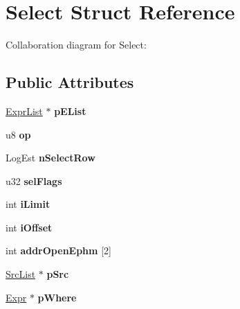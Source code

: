 \hypertarget{structSelect}{}\section{Select Struct Reference}
\label{structSelect}


Collaboration diagram for Select\+:
\subsection*{Public Attributes}
\begin{DoxyCompactItemize}
\item 
\hyperlink{structExprList}{Expr\+List} $\ast$ {\bfseries p\+E\+List}\hypertarget{structSelect_acf92c5d6b0e0e6a3263a77696baaadc8}{}\label{structSelect_acf92c5d6b0e0e6a3263a77696baaadc8}

\item 
u8 {\bfseries op}\hypertarget{structSelect_a84506d61248313b5e10f7891cb7482be}{}\label{structSelect_a84506d61248313b5e10f7891cb7482be}

\item 
Log\+Est {\bfseries n\+Select\+Row}\hypertarget{structSelect_af9e46e47a41ceb9815690851f7e88219}{}\label{structSelect_af9e46e47a41ceb9815690851f7e88219}

\item 
u32 {\bfseries sel\+Flags}\hypertarget{structSelect_a8114a0684cb5f38d5f6ef3855114c928}{}\label{structSelect_a8114a0684cb5f38d5f6ef3855114c928}

\item 
int {\bfseries i\+Limit}\hypertarget{structSelect_abf68908bf029af42a32c60a2558a8b1e}{}\label{structSelect_abf68908bf029af42a32c60a2558a8b1e}

\item 
int {\bfseries i\+Offset}\hypertarget{structSelect_ac12bebd00ed988df3ad1efb8e6c63fe4}{}\label{structSelect_ac12bebd00ed988df3ad1efb8e6c63fe4}

\item 
int {\bfseries addr\+Open\+Ephm} \mbox{[}2\mbox{]}\hypertarget{structSelect_a7b55849c381b5452e42313aa7aa183ec}{}\label{structSelect_a7b55849c381b5452e42313aa7aa183ec}

\item 
\hyperlink{structSrcList}{Src\+List} $\ast$ {\bfseries p\+Src}\hypertarget{structSelect_a4e3b9b176a8e1b4af988405ff1f090db}{}\label{structSelect_a4e3b9b176a8e1b4af988405ff1f090db}

\item 
\hyperlink{structExpr}{Expr} $\ast$ {\bfseries p\+Where}\hypertarget{structSelect_a0562c1e19acde263a04af015611d8ce8}{}\label{structSelect_a0562c1e19acde263a04af015611d8ce8}


\end{DoxyCompactItemize}
